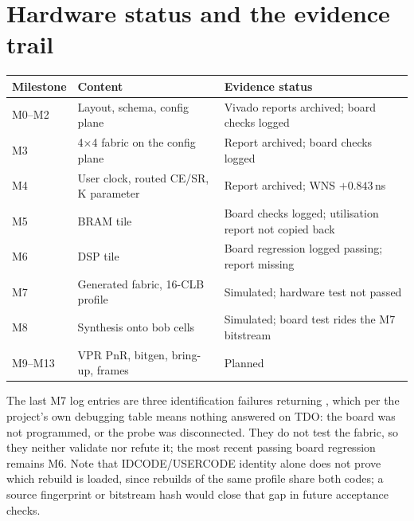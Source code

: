 \documentclass[11pt,a4paper]{article}
\newcommand{\code}[1]{\texttt{\detokenize{#1}}}
\begin{document}
\section{Hardware status and the evidence trail}
\label{sec:status}
\begin{longtable}{p{}p{}p{}}
\toprule
Milestone & Content & Evidence status\\\midrule\endhead
M0--M2 & Layout, schema, config plane & Vivado reports archived; board checks logged\\
M3 & 4$\times$4 fabric on the config plane & Report archived; board checks logged\\
M4 & User clock, routed CE/SR, K parameter & Report archived; WNS $+0.843$\,ns\\
M5 & BRAM tile & Board checks logged; utilisation report not copied back\\
M6 & DSP tile & Board regression logged passing; report missing\\
M7 & Generated fabric, 16-CLB profile & Simulated; hardware test not passed\\
M8 & Synthesis onto bob cells & Simulated; board test rides the M7 bitstream\\
M9--M13 & VPR PnR, bitgen, bring-up, frames & Planned\\\bottomrule
\end{longtable}
The last M7 log entries are three identification failures returning
\code{0xFFFFFFFF}, which per the project's own debugging table means nothing
answered on TDO: the board was not programmed, or the probe was disconnected.
They do not test the fabric, so they neither validate nor refute it; the most
recent passing board regression remains M6. Note that IDCODE/USERCODE identity
alone does not prove which rebuild is loaded, since rebuilds of the same
profile share both codes; a source fingerprint or bitstream hash would close
that gap in future acceptance checks.
\end{document}
